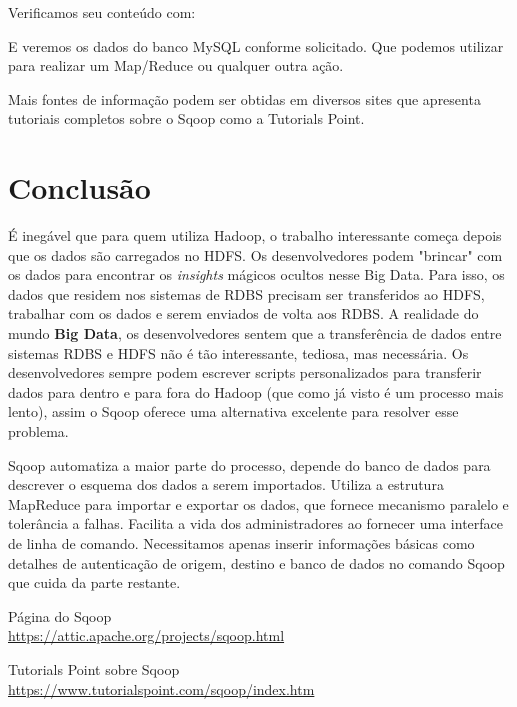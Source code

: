 \documentclass[a4paper,11pt]{article}
\begin{document}
Verificamos seu conteúdo com: \\

E veremos os dados do banco MySQL conforme solicitado. Que podemos utilizar para realizar um Map/Reduce ou qualquer outra ação.

Mais fontes de informação podem ser obtidas em diversos sites que apresenta tutoriais completos sobre o Sqoop como a Tutorials Point\cite{tutorialspoint}.

\section{Conclusão}
É inegável que para quem utiliza Hadoop, o trabalho interessante começa depois que os dados são carregados no HDFS. Os desenvolvedores podem "brincar" com os dados para encontrar os \textit{insights} mágicos ocultos nesse Big Data. Para isso, os dados que residem nos sistemas de RDBS precisam ser transferidos ao HDFS, trabalhar com os dados e serem enviados de volta aos RDBS. A realidade do mundo \textbf{Big Data}, os desenvolvedores sentem que a transferência de dados entre sistemas RDBS e HDFS não é tão interessante, tediosa, mas necessária. Os desenvolvedores sempre podem escrever scripts personalizados para transferir dados para dentro e para fora do Hadoop (que como já visto é um processo mais lento), assim o Sqoop oferece uma alternativa excelente para resolver esse problema.

Sqoop automatiza a maior parte do processo, depende do banco de dados para descrever o esquema dos dados a serem importados. Utiliza a estrutura MapReduce para importar e exportar os dados, que fornece mecanismo paralelo e tolerância a falhas. Facilita a vida dos administradores ao fornecer uma interface de linha de comando. Necessitamos apenas inserir informações básicas como detalhes de autenticação de origem, destino e banco de dados no comando Sqoop que cuida da parte restante. 



\begin{thebibliography}{4}
	Página do Sqoop \\
	\url{https://attic.apache.org/projects/sqoop.html}

	Tutorials Point sobre Sqoop \\
	\url{https://www.tutorialspoint.com/sqoop/index.htm}
	
	
\end{thebibliography}
\end{document}
